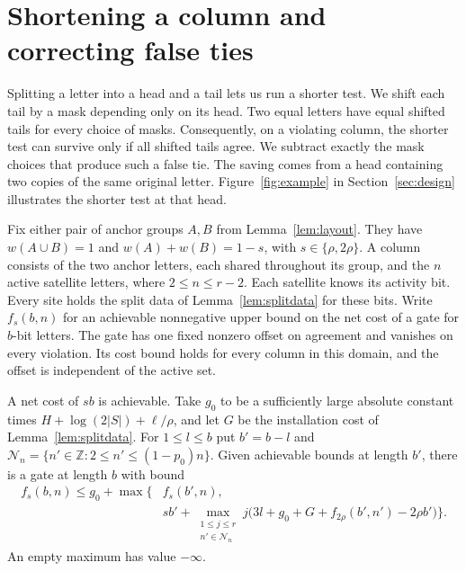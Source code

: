 \section{Shortening a column and correcting false ties}\label{sec:masks}

Splitting a letter into a head and a tail lets us run a shorter test.
We shift each tail by a mask depending only on its head. Two equal
letters have equal shifted tails for every choice of masks. Consequently,
on a violating column, the shorter test can survive only if all shifted
tails agree. We subtract exactly the mask choices that produce such a
false tie. The saving comes from a head containing two copies of the
same original letter. Figure~\ref{fig:example} in
Section~\ref{sec:design} illustrates the shorter test at that head.

Fix either pair of anchor groups \(A,B\) from Lemma~\ref{lem:layout}.
They have \(w(A\cup B)=1\) and \(w(A)+w(B)=1-s\), with
\(s\in\{\rho,2\rho\}\). A column consists of the two anchor letters,
each shared throughout its group, and the \(n\) active satellite
letters, where \(2\le n\le r-2\). Each satellite knows its activity
bit. Every site holds the split data of Lemma~\ref{lem:splitdata} for
these bits. Write \(f_s(b,n)\) for an achievable nonnegative upper
bound on the net cost of a gate for \(b\)-bit letters. The gate has one
fixed nonzero offset on agreement and vanishes on every violation. Its
cost bound holds for every column in this domain, and the offset is
independent of the active set.

\begin{lemma}\label{lem:mask-recursion}
A net cost of \(s b\) is achievable. Take \(g_0\) to be a sufficiently
large absolute constant times \(H+\log(2|S|)+\ell/\rho\), and let
\(G\) be the installation cost of Lemma~\ref{lem:splitdata}. For
\(1\le l\le b\) put \(b'=b-l\) and
\(\mathcal N_n=\{n'\in\mathbb Z:2\le n'\le(1-p_0)n\}\).
Given achievable bounds at length \(b'\), there is a gate at length
\(b\) with bound
\begin{equation}\label{eq:recursion}
\begin{aligned}
f_s(b,n) \le g_0+\max\Big\{&
  f_s(b',n),\\[-2pt]
& s b'+\max_{\substack{1\le j\le r\\ n'\in\mathcal N_n}}
 j\big(3l+g_0+G+f_{2\rho}(b',n')-2\rho b'\big)\Big\}.
\end{aligned}
\end{equation}
An empty maximum has value \(-\infty\).
\end{lemma}

